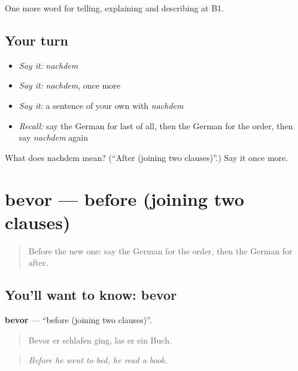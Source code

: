 \begin{grammarlens}[title={What you've built}]
One more word for telling, explaining and describing at B1.
\end{grammarlens}

\subsection*{Your turn}
\begin{itemize}
\raggedright
  \item \emph{Say it:} \emph{nachdem}
  \item \emph{Say it:} \emph{nachdem}, once more
  \item \emph{Say it:} a sentence of your own with \emph{nachdem}
  \item \emph{Recall:} say the German for last of all, then the German for the order, then say \emph{nachdem} again
\end{itemize}

\begin{tcolorbox}[breakable,colback=teal!4,colframe=teal!35!black,title={Before you move on}]
What does nachdem mean? (\textquotedblleft{}After (joining two clauses)\textquotedblright{}.) Say it once more.
\end{tcolorbox}
\section[bevor]{bevor — before (joining two clauses)}

\label{lesson:GE-C263-bevor}



\begin{quote}
Before the new one: say the German for the order, then the German for after.
\end{quote}

\subsection*{You'll want to know: bevor}
\textbf{bevor} — \textquotedblleft{}before (joining two clauses)\textquotedblright{}.

\begin{quote}
Bevor er schlafen ging, las er ein Buch.
\end{quote}

\begin{quote}
\emph{Before he went to bed, he read a book.}
\end{quote}

